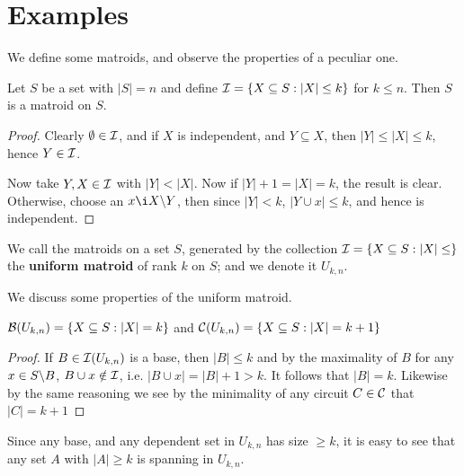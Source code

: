 
\section{Examples}

We define some matroids, and observe the properties of a peculiar one.

\begin{proposition}\label{1.2.1}
    Let $S$ be a set with  $|S|=n$ and define  $\mathcal{I}=\{X \subseteq S: |X| \leq k\}$ for $k \leq n$.
    Then  $S$ is a matroid on  $S$.
\end{proposition}
\begin{proof}
    Clearly $\emptyset \in \mathcal{I}$, and if $X$ is independent, and  $Y \subseteq X$, then  $|Y| \leq
    |X| \leq k$, hence  $Y \in \mathcal{I}$. 

    Now take $Y,X \in \mathcal{I}$ with  $|Y|<|X|$. Now if  $|Y|+1=|X|=k$, the result is clear. Otherwise,
    choose an  $x \i \com{X}{Y}$, then since $|Y|<k$,  $|Y \cup x| \leq k$, and hence is
    independent.
\end{proof}

\begin{definition}
    We call the matroids on a set $S$, generated by the collection  $\mathcal{I}=\{X \subseteq S:|X| \leq
    \}$ the \textbf{uniform matroid} of rank $k$ on  $S$; and we denote it  $U_{k,n}$.
\end{definition}

We discuss some properties of the uniform matroid.

\begin{corollary}
    $\mathcal{B}(U_{k,n})=\{X \subseteq S: |X|=k\}$ and $\mathcal{C}(U_{k,n})=\{X \subseteq S: |X|=k+1\}$
\end{corollary}
\begin{proof}
    If $B \in \mathcal{I}(U_{k,n})$ is a base, then $|B| \leq k$ and by the maximality of $B$ for any $x \in
    S\backslash B$, $B \cup x \notin \mathcal{I}$, i.e.  $|B \cup x|=|B|+1>k$. It follows that  $|B|=k$.
    Likewise by the same reasoning we see by the minimality of any circuit $C \in \mathcal{C}$ that $|C|=k+1$
\end{proof}
\begin{remark}
    Since any base, and any dependent set in $U_{k,n}$ has size $\geq k$, it is easy to see that any
    set  $A$ with  $|A| \geq k$ is spanning in  $U_{k,n}$.
\end{remark}

